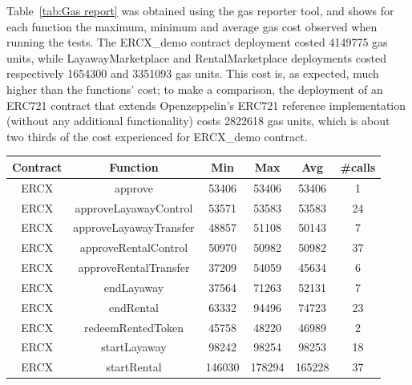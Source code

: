 \documentclass[english, LaM, oneside]{sapthesis}%
\begin{document}
Table~\ref{tab:Gas report} was obtained using the gas reporter tool, and shows for each function the maximum, minimum and average gas cost observed when running the tests.\newline
The ERCX\_demo contract deployment costed 4149775 gas units, while LayawayMarketplace and RentalMarketplace deployments costed respectively 1654300 and 3351093 gas units. This cost is, as expected, much higher than the functions' cost; to make a comparison, the deployment of an ERC721 contract that extends Openzeppelin's ERC721 reference implementation (without any additional functionality) costs 2822618 gas units, which is about two thirds of the cost experienced for ERCX\_demo contract.

\begin{table}
\centering
\begin{adjustbox}{width=0.75\textwidth}
\small
\begin{tabular}{@{}cccccc@{}}
\toprule
\textbf{Contract}  & \textbf{Function}            & \textbf{Min} & \textbf{Max} & \textbf{Avg} & \textbf{\#calls} \\ \midrule
ERCX               & approve                      & 53406        & 53406        & 53406        & 1                \\
ERCX               & approveLayawayControl        & 53571        & 53583        & 53583        & 24               \\
ERCX               & approveLayawayTransfer       & 48857        & 51108        & 50143        & 7                \\
ERCX               & approveRentalControl         & 50970        & 50982        & 50982        & 37               \\
ERCX               & approveRentalTransfer        & 37209        & 54059        & 45634        & 6                \\
ERCX               & endLayaway                   & 37564        & 71263        & 52131        & 7                \\
ERCX               & endRental                    & 63332        & 94496        & 74723        & 23               \\
ERCX               & redeemRentedToken            & 45758        & 48220        & 46989        & 2                \\
ERCX               & startLayaway                 & 98242        & 98254        & 98253        & 18               \\
ERCX               & startRental                  & 146030       & 178294       & 165228       & 37               \\

\end{tabular}
\end{adjustbox}
\end{table}
\end{document}
